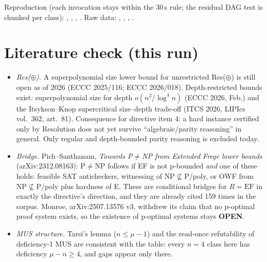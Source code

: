 \documentclass[11pt]{article}
\theoremstyle{remark}
\begin{document}
Reproduction (each invocation stays within the 30\,s rule; the residual DAG test is chunked per class):
,
,
,
. Raw data:
,
,
,
.

\section{Literature check (this run)}
\begin{itemize}
\item \emph{Res($\oplus$).} A superpolynomial size lower bound for unrestricted Res($\oplus$) is
still open as of 2026 (ECCC 2025/116; ECCC 2026/018). Depth-restricted bounds exist: superpolynomial
size for depth $o(n^2/\log^4 n)$ (ECCC 2026, Feb.) and the Itsykson--Knop supercritical size--depth
trade-off (ITCS 2026, LIPIcs vol.~362, art.~81). Consequence for directive item 4: a
hard instance certified only by Resolution does not yet survive ``algebraic/parity reasoning'' in
general. Only regular and depth-bounded parity reasoning is excluded today.
\item \emph{Bridge.} Pich--Santhanam, \emph{Towards P$\ne$NP from Extended Frege lower bounds}
(arXiv:2312.08163): P$\ne$NP follows if EF is not p-bounded \emph{and} one of these holds: feasible
SAT anticheckers, witnessing of NP$\not\subseteq$P/poly, or OWF from NP$\not\subseteq$P/poly plus
hardness of E. These are conditional bridges for $R=\mathrm{EF}$ in exactly the directive's
direction, and they are already cited 159 times in the corpus. Monroe, arXiv:2507.13576 v3, withdrew
its claim that no p-optimal proof system exists, so the existence of p-optimal systems stays
\textbf{OPEN}.
\item \emph{MUS structure.} Tarsi's lemma ($n\le\mu-1$) and the read-once refutability of
deficiency-1 MUS are consistent with the table: every $n=4$ class here has deficiency
$\mu-n\ge4$, and gaps appear only there.
\end{itemize}
\end{document}
